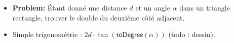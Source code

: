 \begin{frame}
    \frametitle{\problemtitle}
    \begin{itemize}
        \item<+-> \textbf{Problem:} Étant donné une distance $d$ et un angle $\alpha$ dans un triangle rectangle, trouver le double du deuxième côté adjacent.
        \item<+-> Simple trigonométrie : $2d\cdot\tan(\mathsf{toDegree}(\alpha))$ (todo : dessin).
    \end{itemize}
\end{frame}
